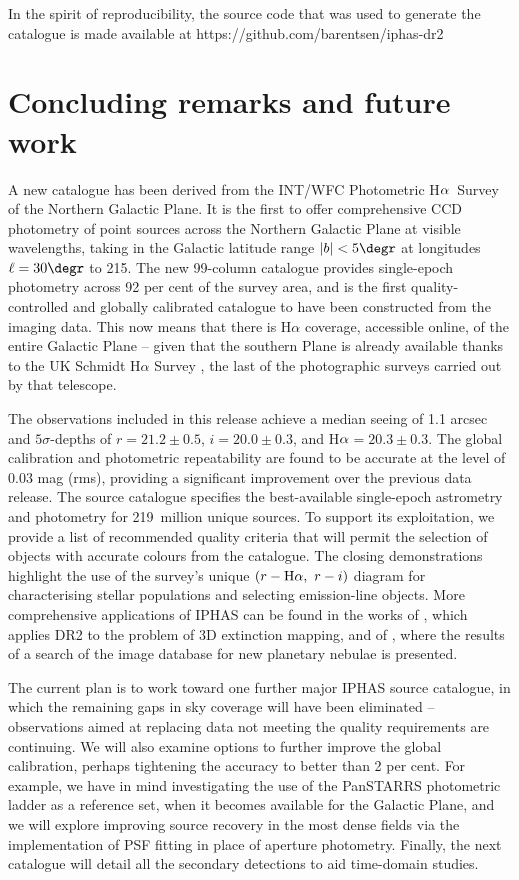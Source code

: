 \documentclass[a4paper,useAMS,usenatbib]{mn2e}
\def\ha{\mbox{H$\rm \alpha$}}
\begin{document}
In the spirit of reproducibility,
the source code that was used to generate
the catalogue is made available at
https://github.com/barentsen/iphas-dr2

\vspace{0.5cm}

\section{Concluding remarks and future work}
\label{sec:conclusions}

A new catalogue has been
derived from the INT/WFC Photometric \ha\ Survey
of the Northern Galactic Plane.
It is the first to offer comprehensive CCD photometry
of point sources across the Northern Galactic Plane at visible wavelengths,
taking in the Galactic latitude range $|b|<5\degr$
at longitudes $\ell=30\degr$ to 215\degr.
The new 99-column catalogue provides single-epoch photometry
across 92 per cent of the survey area,
and is the first quality-controlled and globally calibrated
catalogue to have been constructed from the imaging data.  This
now means that there is H$\alpha$ coverage, accessible online,
of the entire Galactic Plane -- given that the 
southern Plane is already available thanks to the UK
Schmidt H$\alpha$ Survey \citep[SHS,][]{Parker2005}, the last of the 
photographic surveys carried out by that telescope.

The observations included in this release
achieve a median seeing of 1.1 arcsec
and $5\sigma$-depths of $r=21.2\pm 0.5$, $i=20.0\pm 0.3$, and \ha$=20.3\pm 0.3$.
The global calibration and photometric repeatability
are found to be accurate at the level of $0.03$ mag (rms),
providing a significant improvement over the 
previous data release.
The source catalogue specifies the best-available
single-epoch astrometry and photometry
for 219~million unique sources.
To support its exploitation, we provide a list of recommended quality criteria
that will permit the selection of objects with accurate colours from 
the catalogue.  The closing demonstrations highlight the use of the 
survey's unique $(r-\ha,\ r-i)$ diagram for characterising stellar populations
and selecting emission-line objects.  More comprehensive applications of IPHAS
can be found in the works of \citet{Sale2014}, which applies DR2 to the problem
of 3D extinction mapping, and of \citet{Sabin2014}, where the results of a search
of the image database for new planetary nebulae is presented. 

The current plan is to work toward
one further major IPHAS source catalogue,
in which the remaining gaps in sky coverage
will have been eliminated
-- observations aimed at replacing data
not meeting the quality requirements are continuing.
We will also examine options to further improve
the global calibration,
perhaps tightening the accuracy to better than 2 per cent.
For example, we have in mind investigating
the use of the PanSTARRS photometric ladder \citep{Magnier2013}
as a reference set,
when it becomes available for the Galactic Plane, and we will 
explore improving source recovery in 
the most dense fields via the implementation of PSF fitting
in place of aperture photometry.  
Finally, the next catalogue will detail all the secondary detections
to aid time-domain studies.
\end{document}
